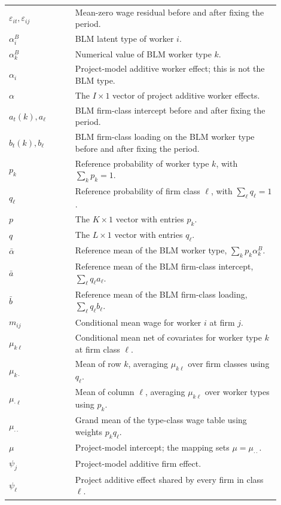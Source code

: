 \documentclass[11pt]{article}
\begin{document}
\begin{longtable}{
  >{\raggedright\arraybackslash}p{0.22\linewidth}
  >{\raggedright\arraybackslash}p{0.68\linewidth}}
\(\varepsilon_{it},\varepsilon_{ij}\) & Mean-zero wage residual before and after fixing the period. \\
\(\alpha_i^B\) & BLM latent type of worker \(i\). \\
\(\alpha_k^B\) & Numerical value of BLM worker type \(k\). \\
\(\alpha_i\) & Project-model additive worker effect; this is not the BLM type. \\
\(\alpha\) & The \(I\times1\) vector of project additive worker effects. \\
\(a_t(k),a_\ell\) & BLM firm-class intercept before and after fixing the period. \\
\(b_t(k),b_\ell\) & BLM firm-class loading on the BLM worker type before and after fixing the period. \\
\(p_k\) & Reference probability of worker type \(k\), with \(\sum_k p_k=1\). \\
\(q_\ell\) & Reference probability of firm class \(\ell\), with \(\sum_\ell q_\ell=1\). \\
\(p\) & The \(K\times1\) vector with entries \(p_k\). \\
\(q\) & The \(L\times1\) vector with entries \(q_\ell\). \\
\(\bar\alpha\) & Reference mean of the BLM worker type, \(\sum_k p_k\alpha_k^B\). \\
\(\bar a\) & Reference mean of the BLM firm-class intercept, \(\sum_\ell q_\ell a_\ell\). \\
\(\bar b\) & Reference mean of the BLM firm-class loading, \(\sum_\ell q_\ell b_\ell\). \\
\(m_{ij}\) & Conditional mean wage for worker \(i\) at firm \(j\). \\
\(\mu_{k\ell}\) & Conditional mean net of covariates for worker type \(k\) at firm class \(\ell\). \\
\(\mu_{k\cdot}\) & Mean of row \(k\), averaging \(\mu_{k\ell}\) over firm classes using \(q_\ell\). \\
\(\mu_{\cdot\ell}\) & Mean of column \(\ell\), averaging \(\mu_{k\ell}\) over worker types using \(p_k\). \\
\(\mu_{\cdot\cdot}\) & Grand mean of the type-class wage table using weights \(p_kq_\ell\). \\
\(\mu\) & Project-model intercept; the mapping sets \(\mu=\mu_{\cdot\cdot}\). \\
\(\psi_j\) & Project-model additive firm effect. \\
\(\psi_\ell\) & Project additive effect shared by every firm in class \(\ell\). \\

\end{longtable}
\end{document}
